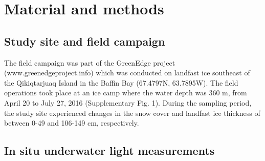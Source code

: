 \section{Material and methods}

\subsection{Study site and field campaign}

The field campaign was part of the GreenEdge project (www.greenedgeproject.info) which was conducted on landfast ice southeast of the Qikiqtarjuaq Island in the Baffin Bay (67.4797N, 63.7895W). The field operations took place at an ice camp where the water depth was 360 m, from April 20 to July 27, 2016 (Supplementary Fig. 1). During the sampling period, the study site experienced changes in the snow cover and landfast ice thickness of between 0-49 and 106-149 cm, respectively.

\subsection{In situ underwater light measurements}

